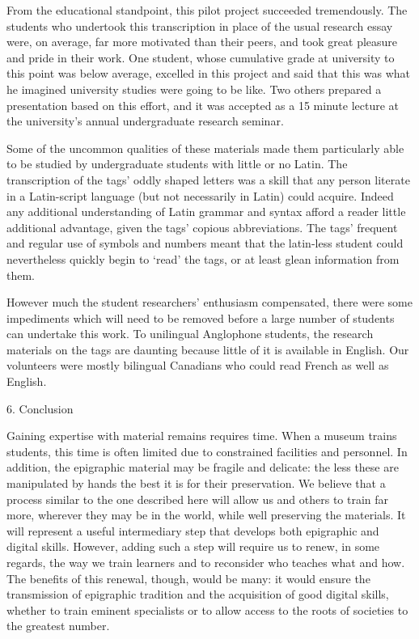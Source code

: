 \documentclass[amsthm,ebook]{saparticle}
\begin{document}
From the educational standpoint, this pilot project succeeded tremendously. The students who undertook this
transcription in place of the usual research essay were, on average, far more motivated than their peers, and took
great pleasure and pride in their work. One student, whose cumulative grade at university to this point was below
average, excelled in this project and said that this was what he imagined university studies were going to be like. Two
others prepared a presentation based on this effort, and it was accepted as a 15 minute lecture at the university’s
annual undergraduate research seminar.

Some of the uncommon qualities of these materials made them particularly able to be studied by undergraduate students
with little or no Latin. The transcription of the tags’ oddly shaped letters was a skill that any person literate in a
Latin-script language (but not necessarily in Latin) could acquire. Indeed any additional understanding of Latin
grammar and syntax afford a reader little additional advantage, given the tags’ copious abbreviations. The tags’
frequent and regular use of symbols and numbers meant that the latin-less student could nevertheless quickly begin to
‘read’ the tags, or at least glean information from them.

However much the student researchers’ enthusiasm compensated, there were some impediments which will need to be removed
before a large number of students can undertake this work. To unilingual Anglophone students, the research materials on
the tags are daunting because little of it is available in English. Our volunteers were mostly bilingual Canadians who
could read French as well as English.

6. Conclusion

Gaining expertise with material remains requires time. When a museum trains students, this time is often limited due to
constrained facilities and personnel. In addition, the epigraphic material may be fragile and delicate: the less these
are manipulated by hands the best it is for their preservation. We believe that a process similar to the one described
here will allow us and others to train far more, wherever they may be in the world, while well preserving the
materials. It will represent a useful intermediary step that develops both epigraphic and digital skills. However,
adding such a step will require us to renew, in some regards, the way we train learners and to reconsider who teaches
what and how. The benefits of this renewal, though, would be many: it would ensure the transmission of epigraphic
tradition and the acquisition of good digital skills, whether to train eminent specialists or to allow access to the
roots of societies to the greatest number.



\end{document}
